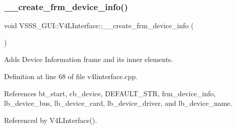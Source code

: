 \mbox{\label{class_v_s_s_s___g_u_i_1_1_v4_l_interface_a91c4e5aea234b253ed674e0ae5bfdd33}} 
\subsubsection{\texorpdfstring{\+\_\+\+\_\+create\+\_\+frm\+\_\+device\+\_\+info()}{\_\_create\_frm\_device\_info()}}
{\footnotesize\ttfamily void V\+S\+S\+S\+\_\+\+G\+U\+I\+::\+V4\+L\+Interface\+::\+\_\+\+\_\+create\+\_\+frm\+\_\+device\+\_\+info (\begin{DoxyParamCaption}{ }\end{DoxyParamCaption})\hspace{0.3cm}{\ttfamily [private]}}



Adds Device Information frame and its inner elements. 



Definition at line 68 of file v4linterface.\+cpp.



References bt\+\_\+start, cb\+\_\+device, D\+E\+F\+A\+U\+L\+T\+\_\+\+S\+TR, frm\+\_\+device\+\_\+info, lb\+\_\+device\+\_\+bus, lb\+\_\+device\+\_\+card, lb\+\_\+device\+\_\+driver, and lb\+\_\+device\+\_\+name.



Referenced by V4\+L\+Interface().


